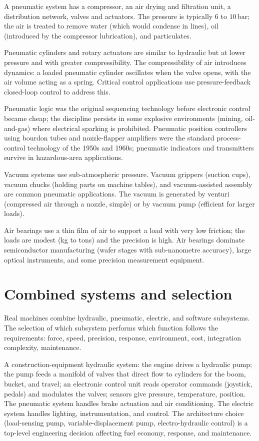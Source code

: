 A pneumatic system has a compressor, an air drying and filtration unit, a distribution network, valves and actuators. The pressure is typically $6$ to $10\,\text{bar}$; the air is treated to remove water (which would condense in lines), oil (introduced by the compressor lubrication), and particulates.

Pneumatic cylinders and rotary actuators are similar to hydraulic but at lower pressure and with greater compressibility. The compressibility of air introduces dynamics: a loaded pneumatic cylinder oscillates when the valve opens, with the air volume acting as a spring. Critical control applications use pressure-feedback closed-loop control to address this.

Pneumatic logic was the original sequencing technology before electronic control became cheap; the discipline persists in some explosive environments (mining, oil-and-gas) where electrical sparking is prohibited. Pneumatic position controllers using bourdon tubes and nozzle-flapper amplifiers were the standard process-control technology of the 1950s and 1960s; pneumatic indicators and transmitters survive in hazardous-area applications.

Vacuum systems use sub-atmospheric pressure. Vacuum grippers (suction cups), vacuum chucks (holding parts on machine tables), and vacuum-assisted assembly are common pneumatic applications. The vacuum is generated by venturi (compressed air through a nozzle, simple) or by vacuum pump (efficient for larger loads).

Air bearings use a thin film of air to support a load with very low friction; the loads are modest (kg to tons) and the precision is high. Air bearings dominate semiconductor manufacturing (wafer stages with sub-nanometre accuracy), large optical instruments, and some precision measurement equipment.

\section{Combined systems and selection}

Real machines combine hydraulic, pneumatic, electric, and software subsystems. The selection of which subsystem performs which function follows the requirements: force, speed, precision, response, environment, cost, integration complexity, maintenance.

A construction-equipment hydraulic system: the engine drives a hydraulic pump; the pump feeds a manifold of valves that direct flow to cylinders for the boom, bucket, and travel; an electronic control unit reads operator commands (joystick, pedals) and modulates the valves; sensors give pressure, temperature, position. The pneumatic system handles brake actuation and air conditioning. The electric system handles lighting, instrumentation, and control. The architecture choice (load-sensing pump, variable-displacement pump, electro-hydraulic control) is a top-level engineering decision affecting fuel economy, response, and maintenance.

